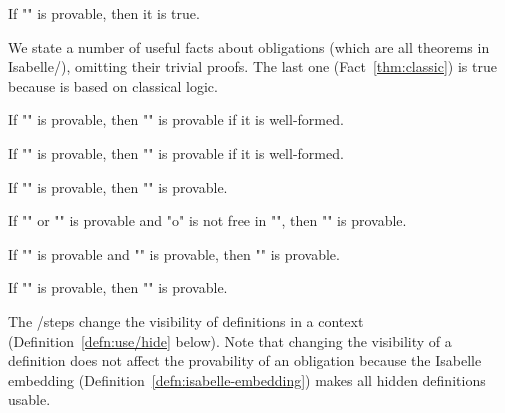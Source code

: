\documentclass[a4paper]{easychair}
\begin{document}
\begin{axm}[Trust] \label{axm:trust} \mbox{}
If "\phi" is provable, then it is true.
\end{axm}

\noindent We state a number of useful facts about
obligations (which are all theorems in Isabelle/\tlaplus),
omitting their trivial proofs. The last one
(Fact~\ref{thm:classic}) is true because \tlaplus is based on
classical logic.

\begin{fac}[Definition] \label{thm:definition}
If "" is provable, then "" is provable if it is well-formed.
\end{fac}

\begin{fac}[Weakening] \label{thm:weaken}
If "" is provable, then "" is
  provable if it is well-formed.
\end{fac}

\begin{fac}[Expansion] \label{thm:expand}
If "" is provable, then "" is provable.
\end{fac}

\begin{fac}[Strengthening] \label{thm:delete}
If "" or "" is provable and "o" is not free in "", then
  "" is provable.
\end{fac}

\begin{fac}[Cut] \label{thm:cut}
If "" is provable and "" is provable,
  then "" is provable.
\end{fac}

\begin{fac} \label{thm:classic}
If "" is provable, then ""
  is provable.
\end{fac}

\noindent The \USE/\HIDE \DEFS steps change the visibility of definitions in a
context (Definition~\ref{defn:use/hide} below). Note that changing the
visibility of a definition does not affect the provability of an obligation
because the Isabelle embedding (Definition~\ref{defn:isabelle-embedding})
makes all hidden definitions usable.
\end{document}

